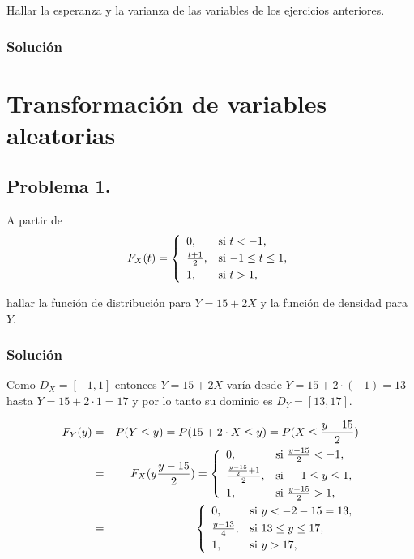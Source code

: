 \documentclass[
]{article}
\begin{document}
Hallar la esperanza y la varianza de las variables de los ejercicios
anteriores.

\hypertarget{soluciuxf3n-10}{%
\subsubsection{Solución}\label{soluciuxf3n-10}}

\hypertarget{transformaciuxf3n-de-variables-aleatorias}{%
\section{Transformación de variables
aleatorias}\label{transformaciuxf3n-de-variables-aleatorias}}

\hypertarget{problema-1.-2}{%
\subsection{Problema 1.}\label{problema-1.-2}}

A partir de \[
F_X(t)=
\left\{\begin{array}{ll}
0, & \mbox{si $t<-1$},
\\[0.1cm]
{t+1\over 2}, & \mbox{si $-1\leq t\leq
1$},
 \\[0.1cm]
1, & \mbox{si $t>1$},
\end{array}\right.
\]

hallar la función de distribución para \(Y=15+2X\) y la función de
densidad para \(Y\).

\hypertarget{soluciuxf3n-11}{%
\subsubsection{Solución}\label{soluciuxf3n-11}}

Como \(D_X=[-1,1]\) entonces \(Y=15+2 X\) varía desde
\(Y=15+2\cdot (-1)=13\) hasta \(Y=15+2\cdot 1=17\) y por lo tanto su
dominio es \(D_Y=[13,17].\)

\begin{eqnarray*}
F_Y(y)&=& P(Y\leq y) =P(15+2\cdot X\leq y )=P(X\leq \frac{y-15}{2})
\\&=& 
F_X(y\frac{y-15}{2})=
\left\{\begin{array}{ll}
0, & \mbox{si } \frac{y-15}{2}<-1,
\\[0.1cm]
{\frac{y-15}{2}+1\over 2}, & \mbox{si } -1\leq y \leq
1,
 \\[0.1cm]
1, & \mbox{si } \frac{y-15}{2}>1,
\end{array}\right.
\\&=& 
\left\{\begin{array}{ll}
0, & \mbox{si } y<-2-15=13
,
\\[0.1cm]
\frac{y-13}{4}, & \mbox{si } 13\leq y \leq
17,
 \\[0.1cm]
1, & \mbox{si } y>17,
\end{array}\right.
\end{eqnarray*}
\end{document}
